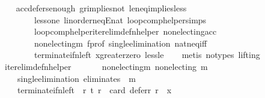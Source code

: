 \begin{isabellebody}
%
\isadelimproof
\ \ %
\endisadelimproof
%
\isatagproof
{}\isamarkupfalse%
\ acc{\isacharunderscore}{\kern0pt}defers{\isacharunderscore}{\kern0pt}enough\ gr{\isacharunderscore}{\kern0pt}implies{\isacharunderscore}{\kern0pt}not{}\ le{\isacharunderscore}{\kern0pt}neq{\isacharunderscore}{\kern0pt}implies{\isacharunderscore}{\kern0pt}less\isanewline
\ \ \ \ \ \ \ \ less{\isacharunderscore}{\kern0pt}one\ linorder{\isacharunderscore}{\kern0pt}neqE{\isacharunderscore}{\kern0pt}nat\ loop{\isacharunderscore}{\kern0pt}comp{\isacharunderscore}{\kern0pt}helper{\isachardot}{\kern0pt}simps{\isacharparenleft}{\kern0pt}{}{\isacharparenright}{\kern0pt}\isanewline
\ \ \ \ \ \ \ \ loop{\isacharunderscore}{\kern0pt}comp{\isacharunderscore}{\kern0pt}helper{\isacharunderscore}{\kern0pt}iter{\isacharunderscore}{\kern0pt}elim{\isacharunderscore}{\kern0pt}def{\isacharunderscore}{\kern0pt}n{\isacharunderscore}{\kern0pt}helper\ non{\isacharunderscore}{\kern0pt}electing{\isacharunderscore}{\kern0pt}acc\isanewline
\ \ \ \ \ \ \ \ non{\isacharunderscore}{\kern0pt}electing{\isacharunderscore}{\kern0pt}m\ f{\isacharunderscore}{\kern0pt}prof\ single{\isacharunderscore}{\kern0pt}elimination\ nat{\isacharunderscore}{\kern0pt}neq{\isacharunderscore}{\kern0pt}iff\isanewline
\ \ \ \ \ \ \ \ terminate{\isacharunderscore}{\kern0pt}if{\isacharunderscore}{\kern0pt}n{\isacharunderscore}{\kern0pt}left\ x{\isacharunderscore}{\kern0pt}greater{\isacharunderscore}{\kern0pt}zero\ less{\isacharunderscore}{\kern0pt}le\isanewline
\ \ \isamarkupfalse%
\ {\isacharparenleft}{\kern0pt}metis\ {\isacharparenleft}{\kern0pt}no{\isacharunderscore}{\kern0pt}types{\isacharcomma}{\kern0pt}\ lifting{\isacharparenright}{\kern0pt}{\isacharparenright}{\kern0pt}%
\endisatagproof
{\isafoldproof}%
%
\isadelimproof
\isanewline
%
\endisadelimproof
\isanewline
{}\isamarkupfalse%
\ iter{\isacharunderscore}{\kern0pt}elim{\isacharunderscore}{\kern0pt}def{\isacharunderscore}{\kern0pt}n{\isacharunderscore}{\kern0pt}helper{\isacharcolon}{\kern0pt}\isanewline
\ \ \isanewline
\ \ \ \ non{\isacharunderscore}{\kern0pt}electing{\isacharunderscore}{\kern0pt}m{\isacharcolon}{\kern0pt}\ {\isachardoublequoteopen}non{\isacharunderscore}{\kern0pt}electing\ m{\isachardoublequoteclose}\ \isanewline
\ \ \ \ single{\isacharunderscore}{\kern0pt}elimination{\isacharcolon}{\kern0pt}\ {\isachardoublequoteopen}eliminates\ {}\ m{\isachardoublequoteclose}\ \isanewline
\ \ \ \ terminate{\isacharunderscore}{\kern0pt}if{\isacharunderscore}{\kern0pt}n{\isacharunderscore}{\kern0pt}left{\isacharcolon}{\kern0pt}\ {\isachardoublequoteopen}{\isasymforall}\ r{\isachardot}{\kern0pt}\ {\isacharparenleft}{\kern0pt}{\isacharparenleft}{\kern0pt}t\ r{\isacharparenright}{\kern0pt}\ {\isasymlongleftrightarrow}\ {\isacharparenleft}{\kern0pt}card\ {\isacharparenleft}{\kern0pt}defer{\isacharunderscore}{\kern0pt}r\ r{\isacharparenright}{\kern0pt}\ {\isacharequal}{\kern0pt}\ x{\isacharparenright}{\kern0pt}{\isacharparenright}{\kern0pt}{\isachardoublequoteclose}\ \isanewline

\end{isabellebody}
